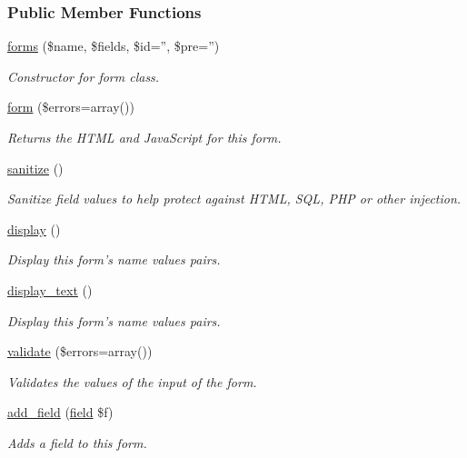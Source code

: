 \subsubsection*{Public Member Functions}
\begin{DoxyCompactItemize}
\item 
\hyperlink{classforms_a89ff17c0b763f0fd16abbe6ebd2dbe96}{forms} (\$name, \$fields, \$id='', \$pre='')
\begin{DoxyCompactList}\small\item\em Constructor for form class. \end{DoxyCompactList}\item 
\hyperlink{classforms_aca4fdeecf56bc5796f628a477f9ce629}{form} (\$errors=array())
\begin{DoxyCompactList}\small\item\em Returns the H\-T\-M\-L and Java\-Script for this form. \end{DoxyCompactList}\item 
\hyperlink{classforms_a2494aca1309491b0ba423e233f4210b3}{sanitize} ()
\begin{DoxyCompactList}\small\item\em Sanitize field values to help protect against H\-T\-M\-L, S\-Q\-L, P\-H\-P or other injection. \end{DoxyCompactList}\item 
\hyperlink{classforms_abbb54cc0731f483777e6baa39f9fe494}{display} ()
\begin{DoxyCompactList}\small\item\em Display this form's name values pairs. \end{DoxyCompactList}\item 
\hyperlink{classforms_ad78a6f47ecded8987dda90468dbb8f77}{display\-\_\-text} ()
\begin{DoxyCompactList}\small\item\em Display this form's name values pairs. \end{DoxyCompactList}\item 
\hyperlink{classforms_a80d7d5c6d738b6f42cfbb258b3c3a3d1}{validate} (\$errors=array())
\begin{DoxyCompactList}\small\item\em Validates the values of the input of the form. \end{DoxyCompactList}\item 
\hyperlink{classforms_ad85afb257cfdcf8834590774fd9ef357}{add\-\_\-field} (\hyperlink{interfacefield}{field} \$f)
\begin{DoxyCompactList}\small\item\em Adds a field to this form. \end{DoxyCompactList}\item 

\end{DoxyCompactItemize}
